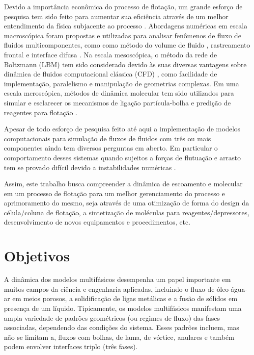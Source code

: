 \documentclass[12pt]{article}
\begin{document}
Devido a importância econômica do processo de flotação, um grande esforço de pesquisa tem sido feito para aumentar sua eficiência através de um melhor entendimento da física subjacente ao processo \cite{ives2012scientific}. Abordagens numéricas em escala macroscópica foram propostas e utilizadas para analisar fenômenos de fluxo de fluidos multicomponentes, como como método do volume de fluido \cite{hirt1981volume}, rastreamento frontal \cite{tryggvason2001front} e interface difusa \cite{anderson1998diffuse}. Na escala mesoscópica, o método da rede de Boltzmann (LBM) \cite{he1997theory} tem sido considerado devido às suas diversas vantagens sobre dinâmica de fluidos computacional clássica (CFD) \cite{kruger2017lattice}, como facilidade de implementação, paralelismo e manipulação de geometrias complexas. Em uma escala mcroscópica, métodos de dinâmica molecular \cite{xia2020role} tem sido utilizados para simular e esclarecer os mecanismos de ligação partícula-bolha \cite{foucaud2019review} e predição de reagentes para flotação \cite{abdalla2018prediction}.

Apesar de todo esforço de pesquisa feito até aqui a implementação de modelos computacionais para simulação de fluxos de fluidos com três ou mais componentes ainda tem diversos perguntas em aberto. Em particular o comportamento desses sistemas quando sujeitos a forças de flutuação e arrasto tem se provado difícil devido a instabilidades numéricas \cite{ghorbanpour2020numerical}. \newline

Assim, este trabalho busca compreender a dinâmica de escoamento e molecular em um processo de flotação para um melhor gerenciamento do processo e aprimoramento do mesmo, seja através de uma otimização de forma do design da célula/coluna de flotação, a sintetização de moléculas para reagentes/depressores, desenvolvimento de novos equipamentos e procedimentos, etc.

\section{Objetivos}
A dinâmica dos modelos multifásicos desempenha um papel importante em muitos campos da ciência e engenharia aplicadas, incluindo o fluxo de óleo-água-ar em meios porosos, a solidificação de ligas metálicas e a fusão de sólidos em presença de um líquido. Tipicamente, os modelos multifásicos manifestam uma ampla variedade de padrões geométricos (ou regimes de fluxo) das fases associadas, dependendo das condições do sistema. Esses padrões incluem, mas não se limitam a, fluxos com bolhas, de lama, de vórtice, anulares e também podem envolver interfaces triplo (três fases).\newline
\end{document}
